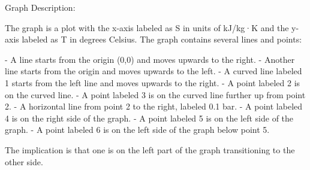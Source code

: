 Graph Description:

The graph is a plot with the x-axis labeled as S in units of kJ/kg·K and the y-axis labeled as T in degrees Celsius. The graph contains several lines and points:

- A line starts from the origin (0,0) and moves upwards to the right.
- Another line starts from the origin and moves upwards to the left.
- A curved line labeled 1 starts from the left line and moves upwards to the right.
- A point labeled 2 is on the curved line.
- A point labeled 3 is on the curved line further up from point 2.
- A horizontal line from point 2 to the right, labeled 0.1 bar.
- A point labeled 4 is on the right side of the graph.
- A point labeled 5 is on the left side of the graph.
- A point labeled 6 is on the left side of the graph below point 5.

The implication is that one is on the left part of the graph transitioning to the other side.
